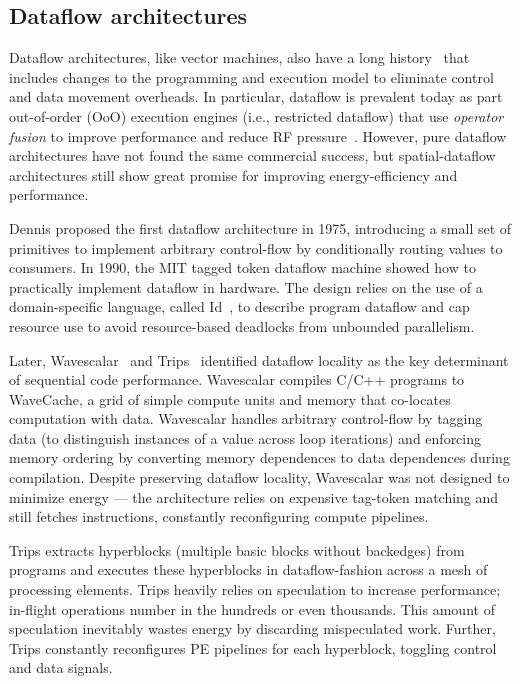 \subsection{Dataflow architectures}
Dataflow architectures, like vector machines, also have a long history~\cite{dennis1975preliminary,dennis1980data,dennis1988efficient,ttda} that includes changes to the programming and execution model to eliminate control and data movement overheads.
% 
% 
In particular, dataflow is prevalent today as part out-of-order (OoO) execution engines (i.e., restricted
dataflow) that use \emph{operator fusion} to improve performance and reduce RF
pressure~\cite{bracy2004dataflow,sassone2004dynamic,kim2002instruction,sembrant2015long,acsiliouglu2015lazy}.
% 
However, pure dataflow architectures have not found the same commercial success, but spatial-dataflow architectures still show great promise for improving energy-efficiency and performance.

Dennis proposed the first dataflow architecture in 1975, introducing a small set of primitives to implement arbitrary control-flow by conditionally routing values to consumers.
% 
In 1990, the MIT tagged token dataflow machine showed how to practically implement dataflow in hardware.
% 
The design relies on the use of a domain-specific language, called Id~\cite{id}, to describe program dataflow and cap resource use to avoid resource-based deadlocks from unbounded parallelism.

Later, Wavescalar~\cite{swanson2003wavescalar} and Trips~\cite{trips} identified dataflow locality as the key determinant of sequential code performance.
% 
Wavescalar compiles C/C++ programs to WaveCache, a grid of simple compute units and memory that co-locates computation with data.
% 
Wavescalar handles arbitrary control-flow by tagging data (to distinguish instances of a value across loop iterations) and enforcing memory ordering by  converting memory dependences to data dependences during compilation.
% 
Despite preserving dataflow locality, Wavescalar was not designed to minimize energy --- the architecture relies on expensive tag-token matching and still fetches instructions, constantly reconfiguring compute pipelines.

Trips extracts hyperblocks (multiple basic blocks without backedges) from programs and executes these hyperblocks in dataflow-fashion across a mesh of processing elements.
% 
Trips heavily relies on speculation to increase performance; in-flight operations number in the hundreds or even thousands.
% 
This amount of speculation inevitably wastes energy by discarding mispeculated work.
% 
Further, Trips constantly reconfigures PE pipelines for each hyperblock, toggling control and data signals.

